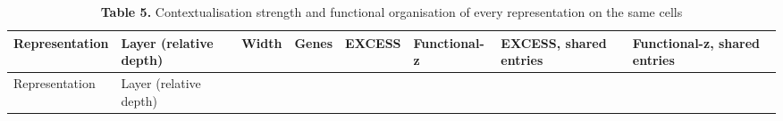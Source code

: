 \documentclass[
  11pt,
]{article}
\begin{document}
\begin{longtable}[]{@{}
  >{\raggedright\arraybackslash}p{}
  >{\raggedright\arraybackslash}p{}
  >{\raggedright\arraybackslash}p{}
  >{\raggedright\arraybackslash}p{}
  >{\raggedright\arraybackslash}p{}
  >{\raggedright\arraybackslash}p{}
  >{\raggedright\arraybackslash}p{}
  >{\raggedright\arraybackslash}p{}@{}}
\caption{\textbf{Table 5.} Contextualisation strength and functional
organisation of every representation on the same cells}\tabularnewline
\toprule\noalign{}
\begin{minipage}[b]{\linewidth}\raggedright
Representation
\end{minipage} & \begin{minipage}[b]{\linewidth}\raggedright
Layer (relative depth)
\end{minipage} & \begin{minipage}[b]{\linewidth}\raggedright
Width
\end{minipage} & \begin{minipage}[b]{\linewidth}\raggedright
Genes
\end{minipage} & \begin{minipage}[b]{\linewidth}\raggedright
EXCESS
\end{minipage} & \begin{minipage}[b]{\linewidth}\raggedright
Functional-z
\end{minipage} & \begin{minipage}[b]{\linewidth}\raggedright
EXCESS, shared entries
\end{minipage} & \begin{minipage}[b]{\linewidth}\raggedright
Functional-z, shared entries
\end{minipage} \\
\midrule\noalign{}
\endfirsthead
\toprule\noalign{}
\begin{minipage}[b]{\linewidth}\raggedright
Representation
\end{minipage} & \begin{minipage}[b]{\linewidth}\raggedright
Layer (relative depth)
\end{minipage} & \begin{minipage}[b]{\linewidth}\raggedright

\end{minipage}
\end{longtable}
\end{document}
